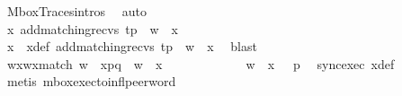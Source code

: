 \begin{isabellebody}
\ MboxTraces{\isachardot}{\kern0pt}intros\ \isamarkupfalse%
\ auto\isanewline
\ \ \ \ \ \ \ \ \ \ \ \ \ \ \isanewline
\ \ \ \ \ \ \ \ \ \ \isamarkupfalse%
\ \isamarkupfalse%
\ {\isachardoublequoteopen}{\isasymexists}x{\isachardot}{\kern0pt}\ {\isacharparenleft}{\kern0pt}add{\isacharunderscore}{\kern0pt}matching{\isacharunderscore}{\kern0pt}recvs\ t{\isacharparenright}{\kern0pt}{\isasymdown}\isactrlsub p\ {\isacharequal}{\kern0pt}\ w\ {\isasymsqdot}\ x{\isachardoublequoteclose}\ \isamarkupfalse%
\isanewline
\ \ \ \ \ \ \ \ \ \ \isamarkupfalse%
\ \isamarkupfalse%
\ x\ \ x{\isacharunderscore}{\kern0pt}def{\isacharcolon}{\kern0pt}\ {\isachardoublequoteopen}{\isacharparenleft}{\kern0pt}add{\isacharunderscore}{\kern0pt}matching{\isacharunderscore}{\kern0pt}recvs\ t{\isacharparenright}{\kern0pt}{\isasymdown}\isactrlsub p\ {\isacharequal}{\kern0pt}\ w\ {\isasymsqdot}\ x{\isachardoublequoteclose}\ \isamarkupfalse%
\ blast\isanewline
\ \ \ \ \ \ \ \ \ \ \isamarkupfalse%
\ \isamarkupfalse%
\ w{\isacharprime}{\kern0pt}x{\isacharprime}{\kern0pt}{\isacharunderscore}{\kern0pt}wx{\isacharunderscore}{\kern0pt}match{\isacharcolon}{\kern0pt}\ {\isachardoublequoteopen}{\isacharparenleft}{\kern0pt}w{\isacharprime}{\kern0pt}\ {\isasymsqdot}\ x{\isacharprime}{\kern0pt}{\isacharparenright}{\kern0pt}{\isasymdown}\isactrlsub {\isacharbang}{\kern0pt}{\isasymdown}\isactrlsub {\isacharbraceleft}{\kern0pt}\isactrlsub p\isactrlsub {\isacharcomma}{\kern0pt}\isactrlsub q\isactrlsub {\isacharbraceright}{\kern0pt}{\isasymdown}\isactrlsub {\isacharbang}{\kern0pt}\isactrlsub {\isacharquery}{\kern0pt}\ {\isacharequal}{\kern0pt}\ {\isacharparenleft}{\kern0pt}w\ {\isasymsqdot}\ x{\isacharparenright}{\kern0pt}{\isasymdown}\isactrlsub {\isacharquery}{\kern0pt}{\isasymdown}\isactrlsub {\isacharbang}{\kern0pt}\isactrlsub {\isacharquery}{\kern0pt}{\isachardoublequoteclose}\ \isamarkupfalse%
\isanewline
\ \ \ \ \ \ \ \ \ \ \isamarkupfalse%
\ {\isachardoublequoteopen}{\isacharparenleft}{\kern0pt}w\ {\isasymsqdot}\ x{\isacharparenright}{\kern0pt}\ {\isasymin}\ {\isasymL}\isactrlsup {\isacharasterisk}{\kern0pt}\ p{\isachardoublequoteclose}\ \isamarkupfalse%
\ sync{\isacharunderscore}{\kern0pt}exec\ x{\isacharunderscore}{\kern0pt}def\ \isamarkupfalse%
\ {\isacharparenleft}{\kern0pt}metis\ mbox{\isacharunderscore}{\kern0pt}exec{\isacharunderscore}{\kern0pt}to{\isacharunderscore}{\kern0pt}infl{\isacharunderscore}{\kern0pt}peer{\isacharunderscore}{\kern0pt}word{\isacharparenright}{\kern0pt}\isanewline

\end{isabellebody}

